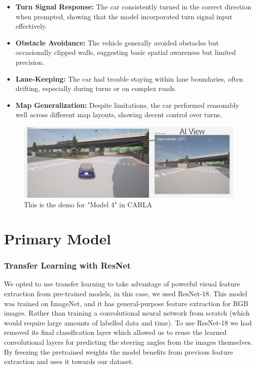 \documentclass{article} %
\begin{document}
\begin{itemize}
  \item \textbf{Turn Signal Response:} The car consistently turned in the correct direction when prompted, showing that the model incorporated turn signal input effectively.

  \item \textbf{Obstacle Avoidance:} The vehicle generally avoided obstacles but occasionally clipped walls, suggesting basic spatial awareness but limited precision.

  \item \textbf{Lane-Keeping:} The car had trouble staying within lane boundaries, often drifting, especially during turns or on complex roads.

  \item \textbf{Map Generalization:} Despite limitations, the car performed reasonably well across different map layouts, showing decent control over turns.
\end{itemize}


\begin{figure}[H] %
    \centering
    \includegraphics[width=1.0\textwidth]{model4demo.png} %
    \caption{This is the demo for "Model 4" in CARLA}
    \label{fig:model4demo}
\end{figure}


\section{Primary Model}


\subsubsection{Transfer Learning with ResNet}

We opted to use transfer learning to take advantage of powerful visual feature extraction from pre-trained models, in this case, we
used ResNet-18. This model was trained on ImageNet, and it has general-purpose feature extraction for RGB images. Rather than training
a convolutional neural network from scratch (which would require large amounts of labelled data and time). To use ResNet-18 we had 
removed its final classification layer which allowed us to reuse the learned convolutional layers for predicting the steering angles from 
the images themselves. By freezing the pretrained weights the model benefits from previous feature extraction and uses it towards our dataset.
\end{document}
